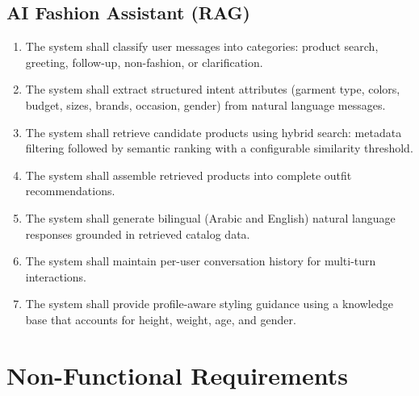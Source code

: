 \subsection{AI Fashion Assistant (RAG)}
\begin{enumerate}[leftmargin=*, label=FR-\arabic*., resume]
    \item The system shall classify user messages into categories: product search, greeting, follow-up, non-fashion, or clarification.
    \item The system shall extract structured intent attributes (garment type, colors, budget, sizes, brands, occasion, gender) from natural language messages.
    \item The system shall retrieve candidate products using hybrid search: metadata filtering followed by semantic ranking with a configurable similarity threshold.
    \item The system shall assemble retrieved products into complete outfit recommendations.
    \item The system shall generate bilingual (Arabic and English) natural language responses grounded in retrieved catalog data.
    \item The system shall maintain per-user conversation history for multi-turn interactions.
    \item The system shall provide profile-aware styling guidance using a knowledge base that accounts for height, weight, age, and gender.
\end{enumerate}

\section{Non-Functional Requirements}

